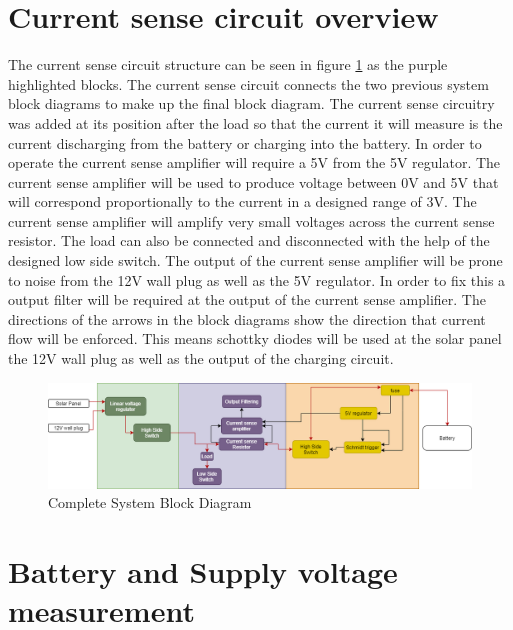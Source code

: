 \section{Current sense circuit overview}
The current sense circuit structure can be seen in figure \ref{fig:finalblock} as the purple highlighted blocks. The current sense circuit connects the two previous system block diagrams to make up the final block diagram.  The current sense circuitry was added at its position after the load so that the current it will measure is the current discharging from the battery or charging into the battery. In order to operate the current sense amplifier will require a 5V from the 5V regulator.  The current sense amplifier will be used to produce voltage between 0V and 5V that will correspond proportionally to the current in a designed range of 3V. The current sense amplifier will amplify very small voltages across the current sense resistor. The load can also be connected and disconnected with the help of the designed low side switch. The output of the current sense amplifier will be prone to noise from the 12V wall plug as well as the 5V regulator. In order to fix this a output filter will be required at the output of the current sense amplifier. The directions of the arrows in the block diagrams show the direction that current flow will be enforced. This means schottky diodes will be used at the solar panel the 12V wall plug as well as the output of the charging circuit. 



\begin{figure}[!htb]
\centering
\includegraphics[scale=0.45]{./Figures/A5}
\caption{Complete System Block Diagram}
\label{fig:finalblock}
\end{figure}


\section{Battery and Supply voltage measurement}




